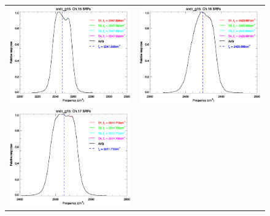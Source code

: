 \begin{figure}[htp]
\begin{tabular}{c c}
    \includegraphics[scale=0.5]{graphics/nominal/sndr_g15.ch15.srf.eps} &
    \includegraphics[scale=0.5]{graphics/nominal/sndr_g15.ch16.srf.eps} \\
    \includegraphics[scale=0.5]{graphics/nominal/sndr_g15.ch17.srf.eps} &

\end{tabular}
\end{figure}

